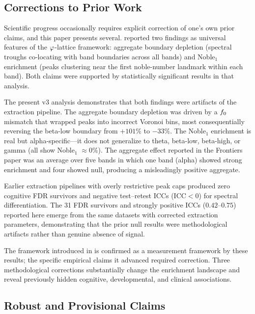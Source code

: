 \subsection{Corrections to Prior Work}

Scientific progress occasionally requires explicit correction of one's own prior claims, and this paper presents several. \textcite{lacy2026frontiers} reported two findings as universal features of the $\varphi$-lattice framework: aggregate boundary depletion (spectral troughs co-locating with band boundaries across all bands) and Noble$_1$ enrichment (peaks clustering near the first noble-number landmark within each band). Both claims were supported by statistically significant results in that analysis.

The present v3 analysis demonstrates that both findings were artifacts of the extraction pipeline. The aggregate boundary depletion was driven by a $f_0$ mismatch that wrapped peaks into incorrect Voronoi bins, most consequentially reversing the beta-low boundary from $+101\%$ to $-33\%$. The Noble$_1$ enrichment is real but alpha-specific---it does not generalize to theta, beta-low, beta-high, or gamma (all show Noble$_1$ $\approx 0\%$). The aggregate effect reported in the Frontiers paper was an average over five bands in which one band (alpha) showed strong enrichment and four showed null, producing a misleadingly positive aggregate.

Earlier extraction pipelines with overly restrictive peak caps produced zero cognitive FDR survivors and negative test--retest ICCs ($\text{ICC} < 0$) for spectral differentiation. The 31 FDR survivors and strongly positive ICCs ($0.42$--$0.75$) reported here emerge from the same datasets with corrected extraction parameters, demonstrating that the prior null results were methodological artifacts rather than genuine absence of signal.

The framework introduced in \textcite{lacy2026frontiers} is confirmed as a measurement framework by these results; the specific empirical claims it advanced required correction. Three methodological corrections substantially change the enrichment landscape and reveal previously hidden cognitive, developmental, and clinical associations.

\subsection{Robust and Provisional Claims}

